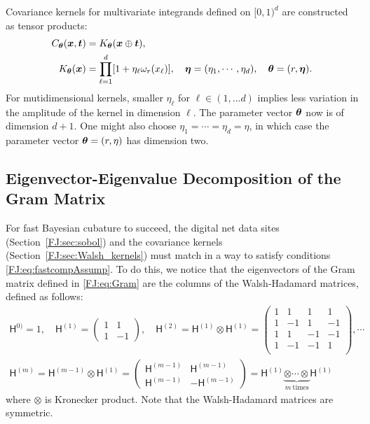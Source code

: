 \documentclass[graybox,footinfo]{svmult}
\begin{document}
Covariance kernels for multivariate integrands defined on $[0,1)^d$ are constructed as tensor products:
\begin{align}
\label{FJ:eqn:digital_shift_in_kernel}
C_{\bstheta}(\bsx, \bst) &= K_{\bstheta} (\bsx \oplus \bst), \\
\label{FJ:eqn:walsh_kernel}
K_{\bstheta} (\bsx) & =  
\prod_{\ell=1}^d  [1 + \eta_\ell \omega_{r} (x_\ell)], \quad \bseta = (\eta_1, \cdots, \eta_d), \quad \bstheta = (r, \bseta).
\end{align}
For mutidimensional kernels, smaller $\eta_\ell$ for $\ell \in (1, \dots d)$ implies less variation in the amplitude of the kernel in dimension $\ell$.  
The parameter vector ${\boldsymbol{\theta}}$ now is of dimension $d+1$.  One might also choose $\eta_1 = \cdots = \eta_d = \eta$, in which case the parameter vector ${\boldsymbol{\theta}} = (r,\eta)$ has dimension two.

\subsection{Eigenvector-Eigenvalue Decomposition of the Gram Matrix}

For fast Bayesian cubature to succeed, the digital net data sites (Section~\ref{FJ:sec:sobol}) and the covariance kernels (Section~\ref{FJ:sec:Walsh_kernels}) must match in a way to satisfy  conditions \eqref{FJ:eq:fastcompAssump}.  To do this, we notice that the eigenvectors of the Gram matrix defined in \eqref{FJ:eq:Gram} are the columns of the Walsh-Hadamard matrices, defined as follows:
\begin{gather}
\nonumber
\mathsf{H}^{0)} = 1, \quad \mathsf{H}^{(1)} =
\begin{pmatrix}
1 & 1 \\ 1 & -1
\end{pmatrix}, \quad
\mathsf{H}^{(2)} = \mathsf{H}^{(1)} \otimes \mathsf{H}^{(1)} = 
\begin{pmatrix}
1 & 1 & 1 & 1 \\ 
1 & -1 & 1 & -1 \\
1 & 1 & -1 & -1 \\ 
1 & -1 & -1 & 1 \\
\end{pmatrix}, \cdots
\\
\label{FJ:eqn:hadamard_matrix}
\mathsf{H}^{(m)} = \mathsf{H}^{(m-1)} \otimes \mathsf{H}^{(1)} =
\begin{pmatrix}
\mathsf{H}^{(m-1)} & \mathsf{H}^{(m-1)} \\ \mathsf{H}^{(m-1)} & -\mathsf{H}^{(m-1)}
\end{pmatrix} 
= \mathsf{H}^{(1)} \underbrace{\otimes \cdots \otimes}_{m \ \text{times}}  \mathsf{H}^{(1)} 
\end{gather}
where $\otimes$ is Kronecker product.
Note that the Walsh-Hadamard matrices are symmetric.
\end{document}
